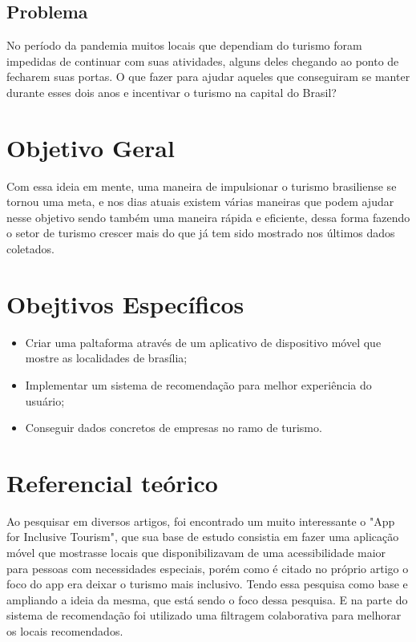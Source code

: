\documentclass[conference]{IEEEtran}
\begin{document}
\subsection{Problema}
No período da pandemia muitos locais que dependiam do turismo foram impedidas de continuar com suas atividades, alguns deles chegando ao ponto de fecharem suas portas. O que fazer para ajudar aqueles que conseguiram se manter durante esses dois anos e incentivar o turismo na capital do Brasil?

\section{Objetivo Geral}
Com essa ideia em mente, uma maneira de impulsionar o turismo brasiliense se tornou uma meta, e nos dias atuais existem várias maneiras que podem ajudar nesse objetivo sendo também uma maneira rápida e eficiente, dessa forma fazendo o setor de turismo crescer mais do que já tem sido mostrado nos últimos dados coletados\cite{b2}. 

\section{Obejtivos Específicos}
\begin{itemize}
    \item Criar uma paltaforma através de um aplicativo de dispositivo móvel que mostre as localidades de brasília;
    \item Implementar um sistema de recomendação para melhor experiência do usuário;
    \item Conseguir dados concretos de empresas no ramo de turismo.
\end{itemize}


\section{Referencial teórico}
Ao pesquisar em diversos artigos, foi encontrado um muito interessante o "App for Inclusive Tourism"\cite{b3}, que sua base de estudo consistia em fazer uma aplicação móvel que mostrasse locais que disponibilizavam de uma acessibilidade maior para pessoas com necessidades especiais, porém como é citado no próprio artigo o foco do app era deixar o turismo mais inclusivo. Tendo essa pesquisa como base e ampliando a ideia da mesma, que está sendo o foco dessa pesquisa. E na parte do sistema de recomendação foi utilizado uma filtragem colaborativa\cite{b4} para melhorar os locais recomendados.
\end{document}
